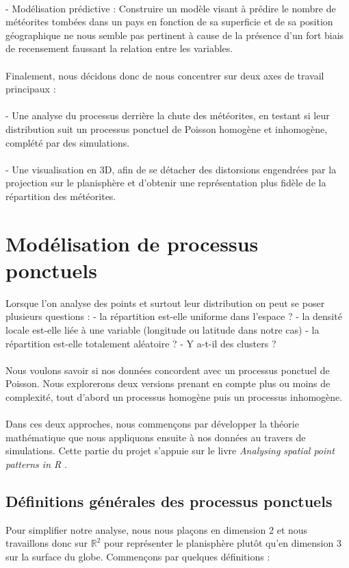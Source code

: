 \documentclass[12pt]{article}
\newcommand{\R}{\mathbb{R}}
\begin{document}
\\
- Modélisation prédictive : Construire un modèle visant à prédire le nombre de météorites tombées dans un pays en fonction de sa superficie et de sa position géographique ne nous semble pas pertinent à cause de la présence d’un fort biais de recensement faussant la relation entre les variables.\\
\\
Finalement, nous décidons donc de nous concentrer sur deux axes de travail principaux :\\
\\
- Une analyse du processus derrière la chute des météorites, en testant si leur distribution suit un processus ponctuel de Poisson homogène et inhomogène, complété par des simulations.\\
\\
- Une visualisation en 3D, afin de se détacher des distorsions engendrées par la projection sur le planisphère et d’obtenir une représentation plus fidèle de la répartition des météorites.\\

\section{Modélisation de processus ponctuels}
Lorsque l'on analyse des points et surtout leur distribution on peut se poser plusieurs questions :
- la répartition est-elle uniforme dans l'espace ?
- la densité locale est-elle liée à une variable (longitude ou latitude dans notre cas)
- la répartition est-elle totalement aléatoire ?
- Y a-t-il des clusters ?\\
\\
Nous voulons savoir si nos données concordent avec un processus ponctuel de Poisson. Nous explorerons deux versions prenant en compte plus ou moins de complexité, tout d'abord un processus homogène puis un processus inhomogène.\\
\\
Dans ces deux approches, nous commençons par développer la théorie mathématique que nous appliquons ensuite à nos données au travers de simulations. Cette partie du projet s'appuie sur le livre \textit{Analysing spatial point patterns in R} \cite{analysing_spacial_points}.

\subsection{Définitions générales des processus ponctuels}
Pour simplifier notre analyse, nous nous plaçons en dimension 2 et nous travaillons donc sur $\R^2$ pour représenter le planisphère plutôt qu'en dimension 3 sur la surface du globe. Commençons par quelques définitions :
\end{document}
